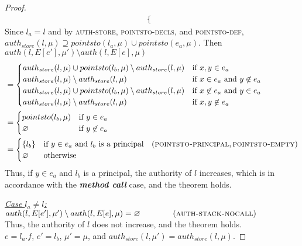 \documentclass{llncs}
\begin{document}
\begin{proof}
\begin{align*}
\begin{cases}
\end{cases}
\end{align*}
Since $l_a = l$ and by \textsc{auth-store}, \textsc{pointsto-decls}, and \textsc{pointsto-def}, $auth_{store}(l, \mu) \supseteq pointsto(l_a, \mu) \cup pointsto(e_a, \mu)$. Then $auth(l, E[e'], \mu') \setminus auth(l, E[e], \mu)$
\begin{align*}
&=
\begin{cases}
    auth_{store}(l, \mu) \cup pointsto(l_b, \mu) \setminus auth_{store}(l, \mu) & \text{if } x, y \in e_a\\
    auth_{store}(l, \mu) \setminus auth_{store}(l, \mu) & \text{if } x \in e_a\text{ and } y \not\in e_a\\
    auth_{store}(l, \mu) \cup pointsto(l_b, \mu) \setminus auth_{store}(l, \mu) & \text{if } x \not\in e_a \text{ and } y \in e_a\\
    auth_{store}(l, \mu) \setminus auth_{store}(l, \mu) & \text{if } x, y \not\in e_a
\end{cases}\\
&=
\begin{cases}
    pointsto(l_b, \mu) & \text{if } y \in e_a\\
    \varnothing & \text{if } y \not\in e_a\\
\end{cases}\\
&=
\begin{cases}
    \{ l_b \} & \text{if } y \in e_a \text{ and } l_b \text { is a principal}~~~(\textsc{pointsto-principal}, \textsc{pointsto-empty})\\
    \varnothing & \text{otherwise}\\
\end{cases}
\end{align*}
Thus, if $y \in e_a$ and $l_b$ is a principal, the authority of $l$ increases, which is in accordance with the \textbf{\textit{method call}} case, and the theorem holds.

\noindent\underline{\textit{Case $l_a \neq l$:}} $auth(l, E[e'], \mu') \setminus auth(l, E[e], \mu) = \varnothing~~~~~~~~~~~~(\textsc{auth-stack-nocall})$\\
Thus, the authority of $l$ does not increase, and the theorem holds.\\


\noindent{}
$e = l_a.f$, $e' = l_b$, $\mu' = \mu$, and $auth_{store}(l, \mu') = auth_{store}(l, \mu)$.


\end{proof}
\end{document}
